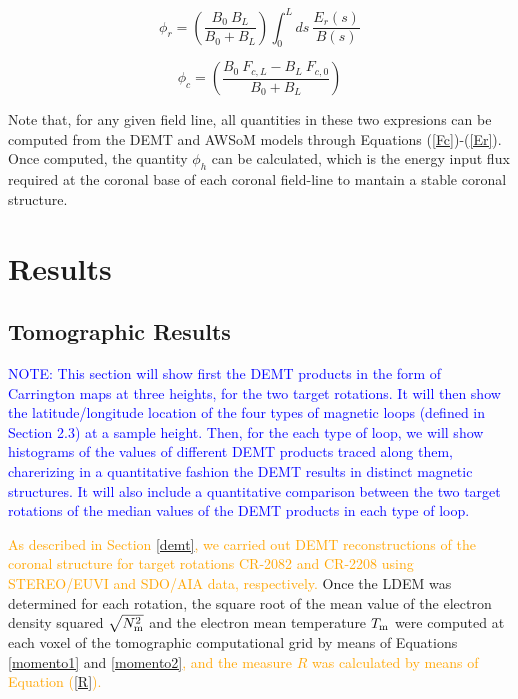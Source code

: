 \documentclass[namedreferences]{solarphysics}
\newcommand{\Tm}{T_{\rm m}}
\newcommand{\Nsqm}{N^2_{{\rm m}}}
\newcommand{\sqravgN}{\sqrt{\Nsqm}}
\def\albert#1{\textcolor{orange}{#1}}
\def\notebyalbert#1{\textcolor{blue}{NOTE: #1}}
\begin{document}
\begin{article}
\begin{equation}\label{phi_r}
\phi_r = \left( \frac{B_0 \ B_L}{B_0 + B_L} \right) \int_{0}^{L} ds \ \frac{E_r(s)}{B(s)}
\end{equation}

\begin{equation}\label{phi_c}
\phi_c = \left( \frac{B_0 \ F_{c,L} - B_L \ F_{c,0}}{B_0 + B_L} \right) 
\end{equation}

{Note that, for any given field line, all quantities in these two expresions can be computed from the DEMT and AWSoM models through Equations (\ref{Fc})-(\ref{Er}). Once computed, the quantity $\phi_h$ can be calculated, which is the energy input flux required at the coronal base of each coronal field-line to mantain a stable coronal structure.}


\section{Results}\label{resu} 

\subsection{Tomographic Results}\label{demt_res} 

\noindent\notebyalbert{This section will show first the DEMT products in the form of Carrington maps at three heights, for the two target rotations. It will then show the latitude/longitude location of the four types of  magnetic loops (defined in Section 2.3) at a sample height. Then, for the each type of loop, we will show histograms of the values of different DEMT products traced along them, charerizing in a quantitative fashion the DEMT results in distinct magnetic structures. It will also include a quantitative comparison between the two target rotations of the median values of the DEMT products in each type of loop.}

\albert{As described in Section \ref{demt}, we carried out DEMT reconstructions of the coronal structure for target rotations CR-2082 and CR-2208 using STEREO/EUVI and SDO/AIA data, respectively.} {Once the LDEM was determined for each rotation, the square root of the mean value of the electron density squared $\sqravgN$ and the electron mean temperature $\Tm$ were computed at each voxel of the tomographic computational grid by means of Equations \ref{momento1} and \ref{momento2}\albert{, and the measure $R$ was calculated by means of Equation (\ref{R}).}} 


\end{article}
\end{document}
